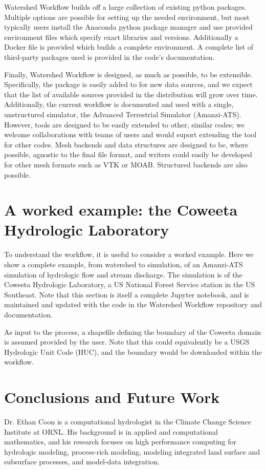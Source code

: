 \documentclass[a4paper,fleqn]{cas-dc}
\begin{document}
Watershed Workflow builds off a large collection of existing python packages.
Multiple options are possible for setting up the needed environment, but most typically users install the Anaconda python package manager and use provided environment files which specify exact libraries and versions.
Additionally a Docker file is provided which builds a complete environment.
A complete list of third-party packages used is provided in the code's documentation.

Finally, Watershed Workflow is designed, as much as possible, to be extensible.
Specifically, the package is easily added to for new data sources, and we expect that the list of available sources provided in the distribution will grow over time.
Additionally, the current workflow is documented and used with a single, unstructured simulator, the Advanced Terrestrial Simulator (Amanzi-ATS)\cite{coon2020coupling,coon2020atsgithub}.
However, tools are designed to be easily extended to other, similar codes; we welcome collaborations with teams of users and would suport extending the tool for other codes.
Mesh backends and data structures are designed to be, where possible, agnostic to the final file format, and writers could easily be developed for other mesh formats such as VTK or MOAB.
Structured backends are also possible.

\section{A worked example: the Coweeta Hydrologic Laboratory}\label{sec:example}
%
To understand the workflow, it is useful to consider a worked example.
Here we show a complete example, from watershed to simulation, of an Amanzi-ATS simulation of hydrologic flow and stream discharge.
The simulation is of the Coweeta Hydrologic Laboratory, a US National Forest Service station in the US Southeast.
Note that this section is itself a complete Jupyter notebook, and is maintained and updated with the code in the Watershed Workflow repository and documentation.

As input to the process, a shapefile defining the boundary of the Coweeta domain is assumed provided by the user.
Note that this could equivalently be a USGS Hydrologic Unit Code (HUC), and the boundary would be downloaded within the workflow.

\section{Conclusions and Future Work}\label{sec:conclusions}

\printcredits








Dr. Ethan Coon is a computational hydrologist in the Climate Change Science Institute at ORNL.
His background is in applied and computational mathematics, and his research focuses on high performance computing for hydrologic modeling, process-rich modeling, modeling integrated land surface and subsurface processes, and model-data integration.
\endbio
\end{document}
